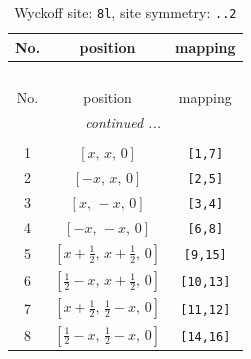 \documentclass[fleqn,8pt]{jsarticle}
\begin{document}
\begin{longtable}{ccc}
\caption{Wyckoff site: {\tt 8l}, site symmetry: {\tt ..2}}
 \\
 \hline \hline
No. & position & mapping \\ \hline \endfirsthead

\multicolumn{2}{l}{\tablename\ \thetable{}} \\
 \hline \hline
No. & position & mapping \\ \hline \endhead

 \hline \hline
\multicolumn{2}{r}{\footnotesize\it continued ...} \\ \endfoot

 \hline \hline
\multicolumn{2}{r}{} \\ \endlastfoot

1 & $\left[ x,\, x,\, 0 \right]$ & {\tt [1,7]} \\ \hline
2 & $\left[ - x,\, x,\, 0 \right]$ & {\tt [2,5]} \\ \hline
3 & $\left[ x,\, - x,\, 0 \right]$ & {\tt [3,4]} \\ \hline
4 & $\left[ - x,\, - x,\, 0 \right]$ & {\tt [6,8]} \\ \hline
5 & $\left[ x + \frac{1}{2},\, x + \frac{1}{2},\, 0 \right]$ & {\tt [9,15]} \\ \hline
6 & $\left[ \frac{1}{2} - x,\, x + \frac{1}{2},\, 0 \right]$ & {\tt [10,13]} \\ \hline
7 & $\left[ x + \frac{1}{2},\, \frac{1}{2} - x,\, 0 \right]$ & {\tt [11,12]} \\ \hline
8 & $\left[ \frac{1}{2} - x,\, \frac{1}{2} - x,\, 0 \right]$ & {\tt [14,16]} \\
\end{longtable}
\renewcommand{\arraystretch}{1.2}
\end{document}
